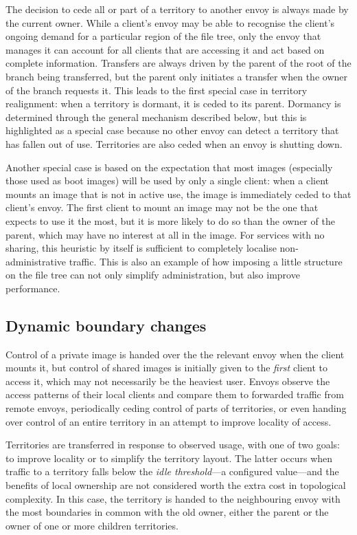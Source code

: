 The decision to cede all or part of a territory to another envoy is always made by the current owner. While a client's envoy may be able to recognise the client's ongoing demand for a particular region of the file tree, only the envoy that manages it can account for all clients that are accessing it and act based on complete information. Transfers are always driven by the parent of the root of the branch being transferred, but the parent only initiates a transfer when the owner of the branch requests it. This leads to the first special case in territory realignment: when a territory is dormant, it is ceded to its parent. Dormancy is determined through the general mechanism described below, but this is highlighted as a special case because no other envoy can detect a territory that has fallen out of use. Territories are also ceded when an envoy is shutting down.

Another special case is based on the expectation that most images (especially those used as boot images) will be used by only a single client: when a client mounts an image that is not in active use, the image is immediately ceded to that client's envoy. The first client to mount an image may not be the one that expects to use it the most, but it is more likely to do so than the owner of the parent, which may have no interest at all in the image. For services with no sharing, this heuristic by itself is sufficient to completely localise non-administrative traffic. This is also an example of how imposing a little structure on the file tree can not only simplify administration, but also improve performance.

\subsection{Dynamic boundary changes}

Control of a private image is handed over the the relevant envoy when the client mounts it, but control of shared images is initially given to the \emph{first} client to access it, which may not necessarily be the heaviest user. Envoys observe the access patterns of their local clients and compare them to forwarded traffic from remote envoys, periodically ceding control of parts of territories, or even handing over control of an entire territory in an attempt to improve locality of access.

Territories are transferred in response to observed usage, with one of two goals: to improve locality or to simplify the territory layout. The latter occurs when traffic to a territory falls below the \emph{idle threshold}---a configured value---and the benefits of local ownership are not considered worth the extra cost in topological complexity. In this case, the territory is handed to the neighbouring envoy with the most boundaries in common with the old owner, either the parent or the owner of one or more children territories.

